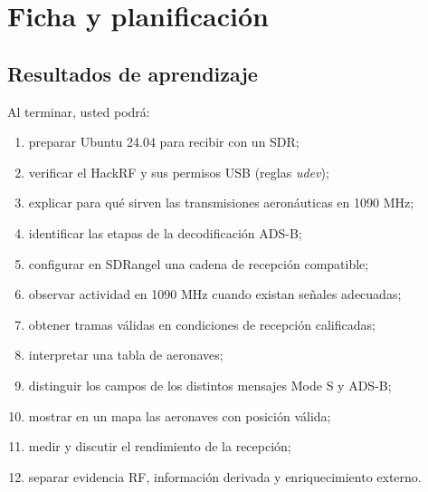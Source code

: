 

\section{Ficha y planificación}
\label{sec:u-plan}

\subsection{Resultados de aprendizaje}

Al terminar, usted podrá:
\begin{enumerate}
  \item preparar Ubuntu 24.04 para recibir con un SDR;
  \item verificar el HackRF y sus permisos USB (reglas \emph{udev});
  \item explicar para qué sirven las transmisiones aeronáuticas en 1090 MHz;
  \item identificar las etapas de la decodificación ADS-B;
  \item configurar en SDRangel una cadena de recepción compatible;
  \item observar actividad en 1090 MHz cuando existan señales adecuadas;
  \item obtener tramas válidas en condiciones de recepción calificadas;
  \item interpretar una tabla de aeronaves;
  \item distinguir los campos de los distintos mensajes Mode S y ADS-B;
  \item mostrar en un mapa las aeronaves con posición válida;
  \item medir y discutir el rendimiento de la recepción;
  \item separar evidencia RF, información derivada y enriquecimiento externo.
\end{enumerate}

